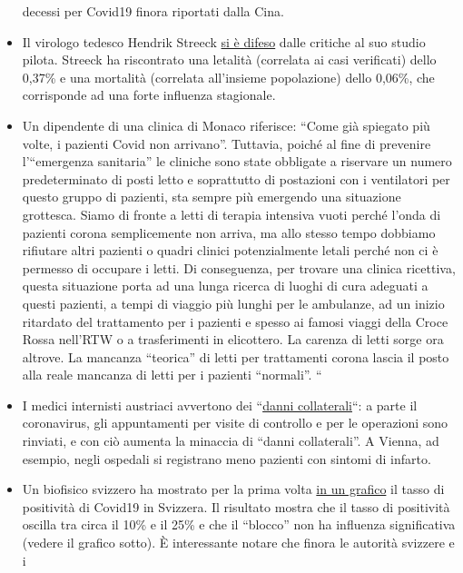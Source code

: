 \begin{itemize}
  decessi per Covid19 finora riportati dalla Cina.
\item
  Il virologo tedesco Hendrik Streeck
  \href{https://www.tagesspiegel.de/wissen/virologe-streeck-zur-coronavirus-studie-die-veroeffentlichung-zu-heinsberg-war-nicht-leichtfertig/25735672.html}{si
  è difeso} dalle critiche al suo studio pilota. Streeck ha riscontrato
  una letalità (correlata ai casi verificati) dello 0,37\% e una
  mortalità (correlata all'insieme popolazione) dello 0,06\%, che
  corrisponde ad una forte influenza stagionale.
\item
  Un dipendente di una clinica di Monaco riferisce: ``Come già spiegato
  più volte, i pazienti Covid non arrivano''. Tuttavia, poiché al fine
  di prevenire l'``emergenza sanitaria'' le cliniche sono state
  obbligate a riservare un numero predeterminato di posti letto e
  soprattutto di postazioni con i ventilatori per questo gruppo di
  pazienti, sta sempre più emergendo una situazione grottesca. Siamo di
  fronte a letti di terapia intensiva vuoti perché l'onda di pazienti
  corona semplicemente non arriva, ma allo stesso tempo dobbiamo
  rifiutare altri pazienti o quadri clinici potenzialmente letali perché
  non ci è permesso di occupare i letti. Di conseguenza, per trovare una
  clinica ricettiva, questa situazione porta ad una lunga ricerca di
  luoghi di cura adeguati a questi pazienti, a tempi di viaggio più
  lunghi per le ambulanze, ad un inizio ritardato del trattamento per i
  pazienti e spesso ai famosi viaggi della Croce Rossa nell'RTW o a
  trasferimenti in elicottero. La carenza di letti sorge ora altrove. La
  mancanza ``teorica'' di letti per trattamenti corona lascia il posto
  alla reale mancanza di letti per i pazienti ``normali''. ``
\item
  I medici internisti austriaci avvertono dei
  ``\href{https://wien.orf.at/stories/3044064}{danni collaterali}``: a
  parte il coronavirus, gli appuntamenti per visite di controllo e per
  le operazioni sono rinviati, e con ciò aumenta la minaccia di ``danni
  collaterali''. A Vienna, ad esempio, negli ospedali si registrano meno
  pazienti con sintomi di infarto.
\item
  Un biofisico svizzero ha mostrato per la prima volta
  \href{https://swprs.org/rate-of-positive-covid19-tests/}{in un
  grafico} il tasso di positività di Covid19 in Svizzera. Il risultato
  mostra che il tasso di positività oscilla tra circa il 10\% e il 25\%
  e che il ``blocco'' non ha influenza significativa (vedere il grafico
  sotto). È interessante notare che finora le autorità svizzere e i

\end{itemize}
